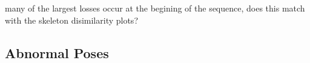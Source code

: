 \documentclass[11pt]{article} %
\begin{document}
many of the largest losses occur at the begining of the sequence, does this match with the skeleton disimilarity plots?






\subsection{Abnormal Poses}
\label{sec:abnormals}










\end{document}

